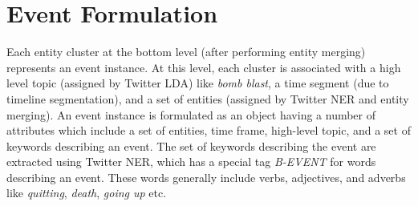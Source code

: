 \section{Event Formulation}
Each entity cluster at the bottom level (after performing entity merging) represents an event instance. At this level, each cluster is associated with a high level topic (assigned by Twitter LDA) like \textit{bomb blast}, a time segment (due to timeline segmentation), and a set of entities (assigned by Twitter NER and entity merging). An event instance is formulated as an object having a number of attributes which include a set of entities, time frame, high-level topic, and a set of keywords describing an event. The set of keywords describing the event are extracted using Twitter NER, which has a special tag \textit{B-EVENT} for words describing an event. These words generally include verbs, adjectives, and adverbs like \textit{quitting}, \textit{death}, \textit{going up} etc.